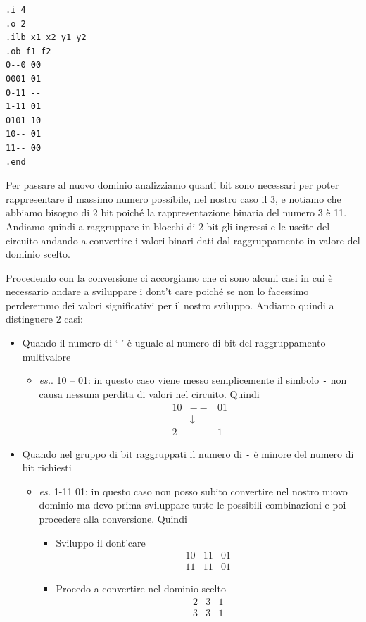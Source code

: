 \documentclass[
  italian,
]{book}
\providecommand{\tightlist}{%
  \setlength{\itemsep}{0pt}\setlength{\parskip}{0pt}}
\begin{document}
\begin{verbatim}
.i 4
.o 2
.ilb x1 x2 y1 y2
.ob f1 f2
0--0 00    
0001 01
0-11 --
1-11 01
0101 10
10-- 01
11-- 00
.end
\end{verbatim}

Per passare al nuovo dominio analizziamo quanti bit sono necessari per poter rappresentare il massimo numero possibile, nel nostro caso il 3, e notiamo che abbiamo bisogno di 2 bit poiché la rappresentazione binaria del numero 3 è 11. Andiamo quindi a raggruppare in blocchi di 2 bit gli ingressi e le uscite del circuito andando a convertire i valori binari dati dal raggruppamento in valore del dominio scelto.

\newpage

Procedendo con la conversione ci accorgiamo che ci sono alcuni casi in cui è necessario andare a sviluppare i dont't care poiché se non lo facessimo perderemmo dei valori significativi per il nostro sviluppo. Andiamo quindi a distinguere 2 casi:

\begin{itemize}
\tightlist
\item
  Quando il numero di `-' è uguale al numero di bit del raggruppamento multivalore

  \begin{itemize}
  \tightlist
  \item
    \emph{es.}. 10 -- 01: in questo caso viene messo semplicemente il simbolo \texttt{-} non causa nessuna perdita di valori nel circuito. Quindi
    \[ \begin{array}{ccc}
      10 & -- & 01 \\ & \downarrow & \\ 2 & - & 1 
      \end{array}\]
  \end{itemize}
\item
  Quando nel gruppo di bit raggruppati il numero di \texttt{-} è minore del numero di bit richiesti

  \begin{itemize}
  \tightlist
  \item
    \emph{es.} 1-11 01: in questo caso non posso subito convertire nel nostro nuovo dominio ma devo prima sviluppare tutte le possibili combinazioni e poi procedere alla conversione. Quindi

    \begin{itemize}
    \tightlist
    \item
      Sviluppo il dont'care
      \[ \begin{array}{ccc}
        10 & 11 & 01 \\11 & 11 & 01
        \end{array}\]
    \item
      Procedo a convertire nel dominio scelto
      \[ \begin{array}{ccc}
        2 & 3 & 1\\
        3 & 3 & 1
        \end{array}\]
    \end{itemize}
  \end{itemize}
\end{itemize}
\end{document}
